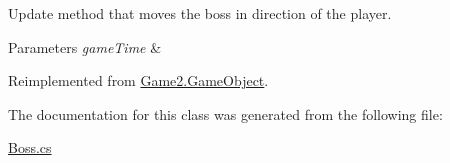 Update method that moves the boss in direction of the player. 


\begin{DoxyParams}{Parameters}
{\em game\+Time} & \\
\hline
\end{DoxyParams}


Reimplemented from \mbox{\hyperlink{class_game2_1_1_game_object_a360a294d8a55dcc747c44f8cc1aefe28}{Game2.\+Game\+Object}}.



The documentation for this class was generated from the following file\+:\begin{DoxyCompactItemize}
\item 
\mbox{\hyperlink{_boss_8cs}{Boss.\+cs}}\end{DoxyCompactItemize}
